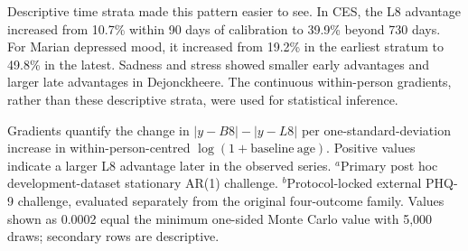 \documentclass[pdflatex,sn-vancouver-num]{sn-jnl}
\begin{document}
Descriptive time strata made this pattern easier to see. In CES, the L8 advantage increased from 10.7\% within 90 days of calibration to 39.9\% beyond 730 days. For Marian depressed mood, it increased from 19.2\% in the earliest stratum to 49.8\% in the latest. Sadness and stress showed smaller early advantages and larger late advantages in Dejonckheere. The continuous within-person gradients, rather than these descriptive strata, were used for statistical inference.

\begin{table}[!htbp]
\caption{Within-person baseline-age gradients and stationary AR(1) challenges.}\label{tab:slope}
\centering
\small
{}
\begin{flushleft}\footnotesize Gradients quantify the change in $|y-B8|-|y-L8|$ per one-standard-deviation increase in within-person-centred $\log(1+\mathrm{baseline\ age})$. Positive values indicate a larger L8 advantage later in the observed series. $^{a}$Primary post hoc development-dataset stationary AR(1) challenge. $^{b}$Protocol-locked external PHQ-9 challenge, evaluated separately from the original four-outcome family. Values shown as 0.0002 equal the minimum one-sided Monte Carlo value with 5,000 draws; secondary rows are descriptive.\end{flushleft}
\end{table}
\end{document}
